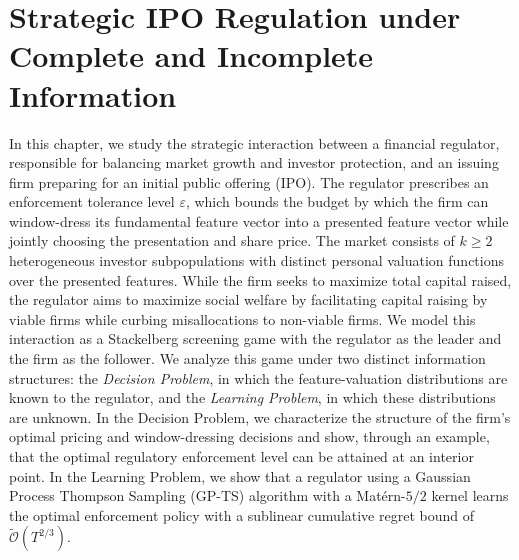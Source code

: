 \chapter{Strategic IPO Regulation under Complete and Incomplete Information}
\label{ch:ipo}
\graphicspath{{Chapter_5_IPO/}}

In this chapter, we study the strategic interaction between a financial regulator, responsible for balancing market growth and investor protection, and an issuing firm preparing for an initial public offering (IPO). The regulator prescribes an enforcement tolerance level $\varepsilon$, which bounds the budget by which the firm can window-dress its fundamental feature vector into a presented feature vector while jointly choosing the presentation and share price. The market consists of $k \ge 2$ heterogeneous investor subpopulations with distinct personal valuation functions over the presented features. While the firm seeks to maximize total capital raised, the regulator aims to maximize social welfare by facilitating capital raising by viable firms while curbing misallocations to non-viable firms. We model this interaction as a Stackelberg screening game with the regulator as the leader and the firm as the follower. We analyze this game under two distinct information structures: the \textit{Decision Problem}, in which the feature-valuation distributions are known to the regulator, and the \textit{Learning Problem}, in which these distributions are unknown. In the Decision Problem, we characterize the structure of the firm's optimal pricing and window-dressing decisions and show, through an example, that the optimal regulatory enforcement level can be attained at an interior point. In the Learning Problem, we show that a regulator using a Gaussian Process Thompson Sampling (GP-TS) algorithm with a Mat\'ern-$5/2$ kernel learns the optimal enforcement policy with a sublinear cumulative regret bound of $\widetilde{\mathcal{O}}(T^{2/3})$.







